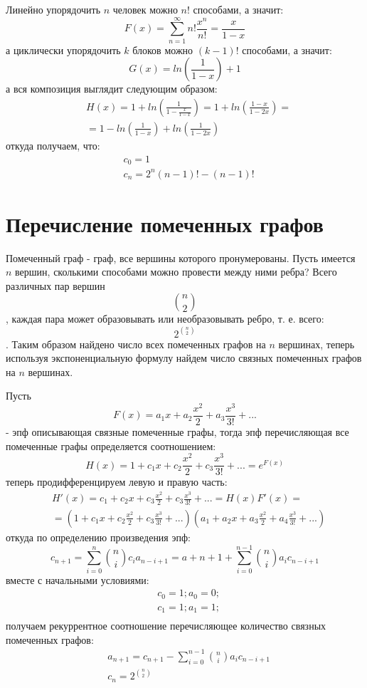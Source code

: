 Линейно упорядочить $n$ человек можно $n!$ способами, а значит:
\[
	F\left(x\right) = \sum_{n=1}^\infty n! \frac{x^n}{n!} = \frac{x}{1-x}
\]
а циклически упорядочить $k$ блоков можно $\left(k-1\right)!$ способами, а значит:
\[
	G\left(x\right) = ln\left(\frac{1}{1-x}\right) + 1
\]
а вся композиция выглядит следующим образом:
\[
	\begin{split}
		& H\left(x\right) = 1+ ln\left(\frac{1}{1-\frac{x}{1-x}}\right) = 1 + ln\left(\frac{1-x}{1-2x}\right) = \\
		& = 1 - ln\left(\frac{1}{1-x}\right) + ln\left(\frac{1}{1-2x}\right)
	\end{split}
\]
откуда получаем, что:
\[
	\begin{split}
		& c_0 = 1 \\
		& c_n = 2^n\left(n-1\right)! - \left(n-1\right)!
	\end{split}
\]

\section{Перечисление помеченных графов}

Помеченный граф - граф, все вершины которого пронумерованы. Пусть имеется $n$ вершин, сколькими способами можно провести между ними ребра? Всего различных пар вершин $$ \binom{n}{2} $$, каждая пара может образовывать или необразовывать ребро, т. е. всего: $$ 2^{\binom{n}{2}} $$. Таким образом найдено число всех помеченных графов на $n$ вершинах, теперь используя экспоненциальную формулу найдем число связных помеченных графов на $n$ вершинах.

Пусть
\[
	F\left(x\right) = a_1 x + a_2\frac{x^2}{2} + a_3 \frac{x^3}{3!} + ...
\]
- эпф описывающая связные помеченные графы, тогда эпф перечисляющая все помеченные графы определяется соотношением:
\[
	H\left(x\right) = 1 + c_1 x + c_2 \frac{x^2}{2} + c_3 \frac{x^3}{3!} + ... = e^{F\left(x\right)}
\]
теперь продифференцируем левую и правую часть:
\[
	\begin{split}
		& H'\left(x\right) = c_1 + c_2 x + c_3 \frac{x^2}{2} + c_3\frac{x^3}{3!} + ... = H\left(x\right)F'\left(x\right) = \\
		& = \left(1 + c_1 x + c_2 \frac{x^2}{2} + c_3 \frac{x^3}{3! } + ... \right)\left(a_1 + a_2 x + a_3 \frac{x^2}{2} + a_4 \frac{x^3}{3!} + ... \right)
	\end{split}
\]
откуда по определению произведения эпф:
\[
	c_{n+1} = \sum_{i=0}^{n}\binom{n}{i} c_i a_{n-i+1} = a+{n+1} + \sum_{i=0}^{n-1} \binom{n}{i} a_i c_{n-i+1}
\]
вместе с начальными условиями:
\[
	\begin{split}
		& c_0 = 1; a_0 = 0;\\
		& c_1 = 1; a_1 = 1;\\
	\end{split}
\]
получаем рекуррентное соотношение перечисляющее количество связных помеченных графов:
\begin{equation}
	\begin{split}
		& a_{n+1} = c_{n+1} - \sum_{i=0}^{n-1} \binom{n}{i} a_i c_{n-i+1} \\
		& c_n = 2^{\binom{n}{2}}
	\end{split}
\end{equation}

